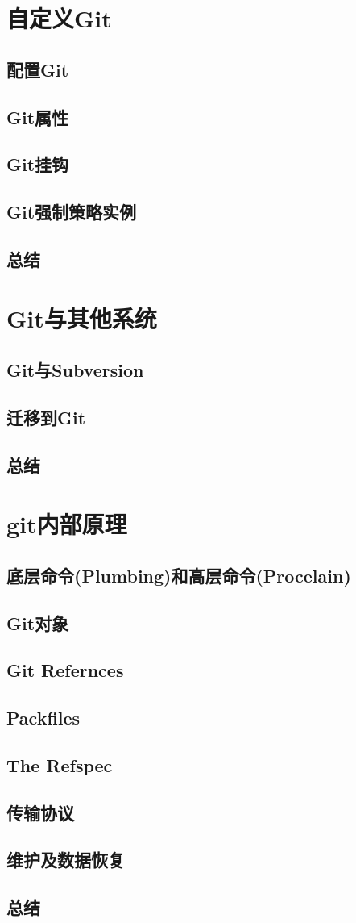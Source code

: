 \documentclass{book}
\begin{document}
\chapter{自定义Git}
	\section{配置Git}
	\section{Git属性}
	\section{Git挂钩}
	\section{Git强制策略实例}
	\section{总结}

\chapter{Git与其他系统}
	\section{Git与Subversion}
	\section{迁移到Git}
	\section{总结}
	
\chapter{git内部原理}
	\section{底层命令(Plumbing)和高层命令(Procelain)}
	\section{Git对象}
	\section{Git Refernces}
	\section{Packfiles}
	\section{The Refspec}
	\section{传输协议}
	\section{维护及数据恢复}
	\section{总结}
\end{document}

